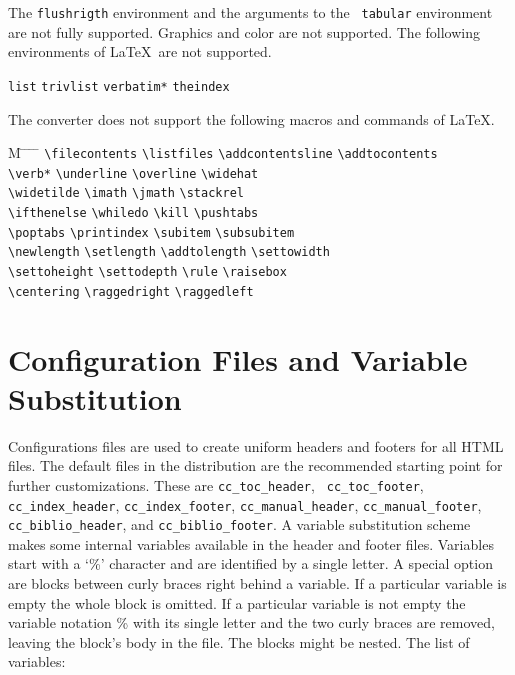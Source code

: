 \documentclass[12pt]{article}
\def\ind{\hspace*{7mm}}
\begin{document}
The {\tt flushrigth} environment and the arguments to the {\tt
  tabular} environment are not fully supported. Graphics and color are
not supported. The following environments of \LaTeX\ are not
supported.

\ind \verb+list+\hfill
\verb+trivlist+\hfill
\verb+verbatim*+\hfill
\verb+theindex+\hfill{}

The converter does not support the following macros and commands of \LaTeX.

\begin{tabbing}
  M \= \hspace*{0.24\textwidth} \= \hspace*{0.24\textwidth} 
    \= \hspace*{0.24\textwidth} \=  \kill
  \>\verb+\filecontents+ \>    \verb+\listfiles+ \>
    \verb+\addcontentsline+ \>    \verb+\addtocontents+\\
  \>\verb+\verb*+ \>    \verb+\underline+ \>
    \verb+\overline+ \>    \verb+\widehat+\\
  \>\verb+\widetilde+ \>    \verb+\imath+ \>
    \verb+\jmath+ \>    \verb+\stackrel+\\
  \>\verb+\ifthenelse+ \>    \verb+\whiledo+ \>
    \verb+\kill+ \>    \verb+\pushtabs+\\
  \>\verb+\poptabs+ \>    \verb+\printindex+ \>
    \verb+\subitem+ \>    \verb+\subsubitem+\\
  \>\verb+\newlength+ \>    \verb+\setlength+ \>
    \verb+\addtolength+ \>    \verb+\settowidth+\\
  \>\verb+\settoheight+ \>    \verb+\settodepth+ \>
    \verb+\rule+ \>    \verb+\raisebox+\\
  \>\verb+\centering+ \>    \verb+\raggedright+ \>
    \verb+\raggedleft+
\end{tabbing}

\section{Configuration Files and Variable Substitution}

 Configurations files are
used to create uniform headers and footers for all HTML files.  The
default files in the distribution are the recommended starting point
for further customizations. These are {\tt cc\_toc\_header}, {\tt
  cc\_toc\_footer}, {\tt cc\_index\_header}, {\tt cc\_index\_footer},
{\tt cc\_manual\_header}, {\tt cc\_manual\_footer}, {\tt
  cc\_biblio\_header}, and {\tt cc\_biblio\_footer}.  A variable
substitution scheme makes some internal variables available in the
header and footer files. Variables start with a `\%' character and are
identified by a single letter. A special option are blocks between
curly braces right behind a variable. If a particular variable is
empty the whole block is omitted. If a particular variable is not
empty the variable notation \% with its single letter and the two
curly braces are removed, leaving the block's body in the file. The
blocks might be nested. The list of variables:
\end{document}
